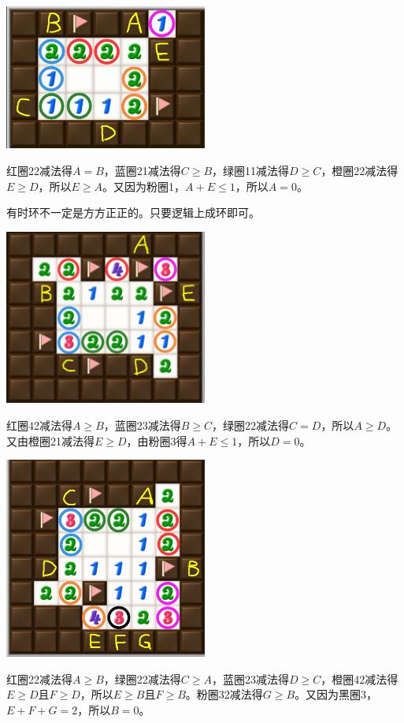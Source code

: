 \vspace{5mm}
\begin{center}
    \includegraphics[width=0.5\textwidth]{trick/环4.png}
\end{center}
红圈22减法得$A=B$，蓝圈21减法得$C\ge B$，绿圈11减法得$D\ge C$，橙圈22减法得$E\ge D$，所以$E\ge A$。又因为粉圈1，$A+E\le 1$，所以$A=0$。

\vspace{5mm}
有时环不一定是方方正正的。只要逻辑上成环即可。

\vspace{5mm}
\begin{center}
    \includegraphics[width=0.5\textwidth]{trick/环5.png}
\end{center}
红圈42减法得$A\ge B$，蓝圈23减法得$B\ge C$，绿圈22减法得$C=D$，所以$A\ge D$。又由橙圈21减法得$E\ge D$，由粉圈3得$A+E\le 1$，所以$D=0$。

\vspace{5mm}
\begin{center}
    \includegraphics[width=0.5\textwidth]{trick/环6.png}
\end{center}
红圈22减法得$A\ge B$，绿圈22减法得$C\ge A$，蓝圈23减法得$D\ge C$，橙圈42减法得$E\ge D$且$F\ge D$，所以$E\ge B$且$F\ge B$。粉圈32减法得$G\ge B$。又因为黑圈3，$E+F+G=2$，所以$B=0$。

